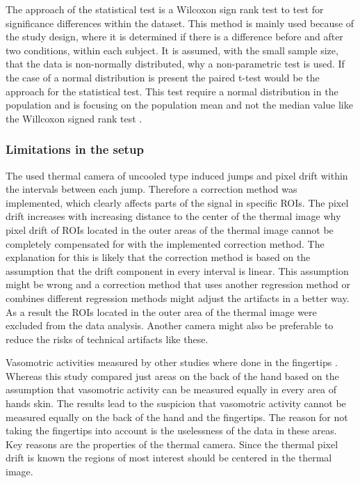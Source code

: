 The approach of the statistical test is a Wilcoxon sign rank test to test for significance differences within the dataset. This method is mainly used because of the study design, where it is determined if there is a difference before and after two conditions, within each subject. It is assumed, with the small sample size, that the data is non-normally distributed, why a non-parametric test is used. If the case of a normal distribution is present the paired t-test would be the approach for the statistical test. This test require a normal distribution in the population and is focusing on the population mean and not the median value like the Willcoxon signed rank test \cite{imam2014}.

\subsubsection{Limitations in the setup}
The used thermal camera of uncooled type induced jumps and pixel drift within the intervals between each jump. Therefore a correction method was implemented, which clearly affects parts of the signal in specific ROIs. The pixel drift increases with increasing distance to the center of the thermal image why pixel drift of ROIs located in the outer areas of the thermal image cannot be completely compensated for with the implemented correction method. The explanation for this is likely that the correction method is based on the assumption that the drift component in every interval is linear. This assumption might be wrong and a correction method that uses another regression method or combines different regression methods might adjust the artifacts in a better way. As a result the ROIs located in the outer area of the thermal image were excluded from the data analysis. Another camera might also be preferable to reduce the risks of technical artifacts like these. 

Vasomotric activities measured by other studies where done in the fingertips \cite{sagaidachnyi2012a, sagaidachnyi2014}. Whereas this study compared just areas on the back of the hand based on the assumption that vasomotric activity can be measured equally in every area of hands skin. The results lead to the suspicion that vasomotric activity cannot be measured equally on the back of the hand and the fingertips. The reason for not taking the fingertips into account is the uselessness of the data in these areas. Key reasons are the properties of the thermal camera. Since the thermal pixel drift is known the regions of most interest should be centered in the thermal image. 

